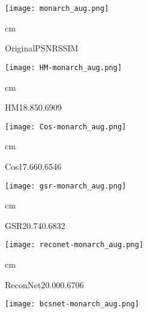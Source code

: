 \documentclass{article}
\begin{document}
\begin{figure*}[tb]
\setlength{\abovecaptionskip}{1.0pt}
\setlength{\belowcaptionskip}{-2.9pt}
\begin{minipage}[t]{0.12\textwidth}
\centering
\texttt{[image: monarch\_aug.png]}
\begin{scriptsize}
\centering
{} cm \begin{tiny}OriginalPSNRSSIM\end{tiny}
\end{scriptsize}
\end{minipage}
\hfill
\begin{minipage}[t]{0.12\textwidth}
\centering
\texttt{[image: HM-monarch\_aug.png]}
\begin{scriptsize}
\centering
{} cm \begin{tiny}HM18.850.6909\end{tiny}
\end{scriptsize}
\end{minipage}
\hfill
\begin{minipage}[t]{0.12\textwidth}
\centering
\texttt{[image: Cos-monarch\_aug.png]}
\begin{scriptsize}
\centering
{} cm \begin{tiny}Cos17.660.6546\end{tiny}
\end{scriptsize}
\end{minipage}
\hfill
\begin{minipage}[t]{0.12\textwidth}
\centering
\texttt{[image: gsr-monarch\_aug.png]}
\begin{scriptsize}
\centering
{} cm \begin{tiny}GSR20.740.6832\end{tiny}
\end{scriptsize}
\end{minipage}
\hfill
\begin{minipage}[t]{0.12\textwidth}
\centering
\texttt{[image: reconet-monarch\_aug.png]}
\begin{scriptsize}
\centering
{} cm \begin{tiny}ReconNet20.000.6706\end{tiny}
\end{scriptsize}
\end{minipage}
\hfill
\begin{minipage}[t]{0.12\textwidth}
\centering
\texttt{[image: bcsnet-monarch\_aug.png]}
\begin{scriptsize}

\end{scriptsize}
\end{minipage}
\end{figure*}
\end{document}
